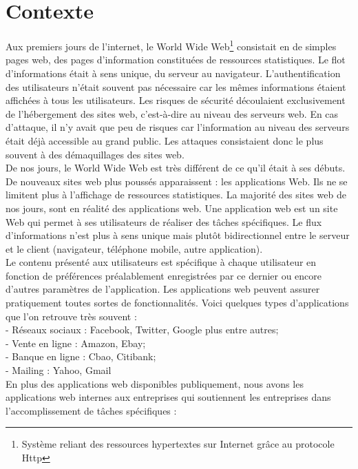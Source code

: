 \section{Contexte}
Aux premiers jours de l’internet, le World Wide Web\footnote{Système reliant des ressources hypertextes sur Internet grâce au protocole Http} consistait en de simples pages web, des pages d’information constituées de ressources statistiques. Le flot d'informations était à sens unique, du serveur au navigateur. L’authentification des utilisateurs n’était souvent pas nécessaire car les mêmes informations étaient affichées à tous les utilisateurs. Les risques de sécurité découlaient exclusivement de l’hébergement des sites web, c’est-à-dire au niveau des serveurs web. En cas d’attaque, il n’y avait que peu de risques car l’information au niveau des serveurs était déjà accessible au grand public. Les attaques consistaient donc le plus souvent à des démaquillages des sites web.\\
De nos jours, le World Wide Web est très différent de ce qu’il était à ses débuts. De nouveaux sites web plus poussés apparaissent : les applications Web. Ils ne se limitent plus à l’affichage de ressources statistiques. La majorité des sites web de nos jours, sont en réalité des applications web. Une application web est un site Web qui permet à ses utilisateurs de réaliser des tâches spécifiques. Le flux d’informations n’est plus à sens unique mais plutôt bidirectionnel entre le serveur et le client (navigateur, téléphone mobile, autre application).\\
Le contenu présenté aux utilisateurs est spécifique à chaque utilisateur en fonction de préférences préalablement enregistrées par ce dernier ou encore d’autres paramètres de l’application. Les applications web peuvent assurer pratiquement toutes sortes de fonctionnalités. Voici quelques types d’applications que l’on retrouve très souvent :\\
- Réseaux sociaux : Facebook, Twitter, Google plus entre autres;\\
- Vente en ligne : Amazon, Ebay;\\
- Banque en ligne : Cbao, Citibank;\\
- Mailing : Yahoo, Gmail\\
En plus des applications web disponibles publiquement, nous avons les applications web internes aux entreprises qui soutiennent les entreprises dans l’accomplissement de tâches spécifiques : \\
